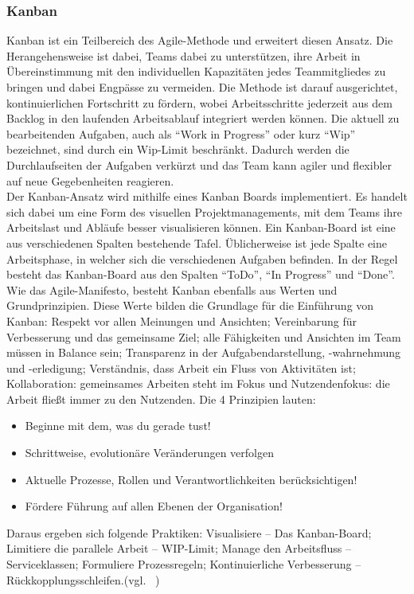 \documentclass[sigconf, nonacm]{acmart}
\begin{document}
\subsubsection{Kanban}
Kanban ist ein Teilbereich des Agile-Methode und erweitert diesen Ansatz. Die Herangehensweise ist dabei, Teams dabei zu unterstützen, ihre Arbeit in Übereinstimmung mit den individuellen Kapazitäten jedes Teammitgliedes zu bringen und dabei Engpässe zu vermeiden. Die Methode ist darauf ausgerichtet, kontinuierlichen Fortschritt zu fördern, wobei Arbeitsschritte jederzeit aus dem Backlog in den laufenden Arbeitsablauf integriert werden können.
Die aktuell zu bearbeitenden Aufgaben, auch als \enquote{Work in Progress} oder kurz \enquote{Wip} bezeichnet, sind durch ein Wip-Limit beschränkt. Dadurch werden die Durchlaufseiten der Aufgaben verkürzt und das Team kann agiler und flexibler auf neue Gegebenheiten reagieren.~\cite{asana_kanban_13_4_23}
\\
Der Kanban-Ansatz wird mithilfe eines Kanban Boards implementiert. Es handelt sich dabei um eine Form des visuellen Projektmanagements, mit dem Teams ihre Arbeitslast und Abläufe besser visualisieren können. Ein Kanban-Board ist eine aus verschiedenen Spalten bestehende Tafel. Üblicherweise ist jede Spalte eine Arbeitsphase, in welcher sich die verschiedenen Aufgaben befinden. In der Regel besteht das Kanban-Board aus den Spalten \enquote{ToDo}, \enquote{In Progress} und \enquote{Done}.
Wie das Agile-Manifesto, besteht Kanban ebenfalls aus Werten und Grundprinzipien.
Diese Werte bilden die Grundlage für die Einführung von Kanban: Respekt vor allen Meinungen und Ansichten; Vereinbarung für Verbesserung und das gemeinsame Ziel; alle Fähigkeiten und Ansichten im Team müssen in Balance sein; Transparenz in der Aufgabendarstellung, -wahrnehmung und -erledigung; Verständnis, dass Arbeit ein Fluss von Aktivitäten ist; Kollaboration: gemeinsames Arbeiten steht im Fokus und Nutzendenfokus: die Arbeit fließt immer zu den Nutzenden.
Die 4 Prinzipien lauten:
\begin{itemize}
    \item  Beginne mit dem, was du gerade tust!
    \item Schrittweise, evolutionäre Veränderungen verfolgen
    \item Aktuelle Prozesse, Rollen und Verantwortlichkeiten berücksichtigen!
    \item Fördere Führung auf allen Ebenen der Organisation!
\end{itemize}
Daraus ergeben sich folgende Praktiken: Visualisiere – Das Kanban-Board; Limitiere die parallele Arbeit – WIP-Limit; Manage den Arbeitsfluss – Serviceklassen; Formuliere Prozessregeln; Kontinuierliche Verbesserung – Rückkopplungsschleifen.(vgl. ~\cite{noauthor_organisationshandbuch_nodate})
\end{document}
